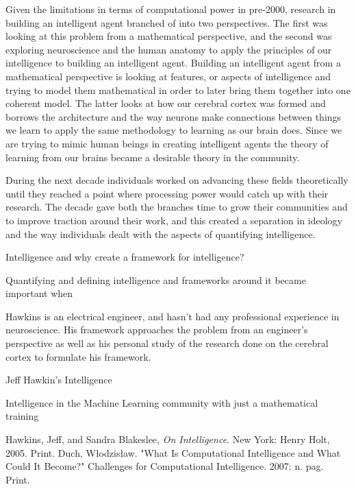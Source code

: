 \documentclass[11pt, oneside]{article}
\begin{document}
\par Given the limitations in terms of computational power in pre-2000, research in building an intelligent agent branched of into two perspectives. The first was looking at this problem from a mathematical perspective, and the second was exploring neuroscience and the human anatomy to apply the principles of our intelligence to building an intelligent agent. Building an intelligent agent from a mathematical perspective is looking at features, or aspects of intelligence and trying to model them mathematical in order to later bring them together into one coherent model. The latter looks at how our cerebral cortex was formed and borrows the architecture and the way neurons make connections between things we learn to apply the same methodology to learning as our brain does. Since we are trying to mimic human beings in creating intelligent agents the theory of learning from our brains became a desirable theory in the community. 

\par During the next decade individuals worked on advancing these fields theoretically until they reached a point where processing power would catch up with their research. The decade gave both the branches time to grow their communities and to improve traction around their work, and this created a separation in ideology and the way individuals dealt with the aspects of quantifying intelligence. 

\par Intelligence and why create a framework for intelligence?
\par Quantifying and defining intelligence and frameworks around it became important when



\par Hawkins is an electrical engineer, and hasn't had any professional experience in neuroscience. His framework approaches the problem from an engineer's perspective as well as his personal study of the research done on the cerebral cortex to formulate his framework.
\par Jeff Hawkin's Intelligence

\par Intelligence in the Machine Learning community with just a mathematical training

\begin{thebibliography}{9}
	Hawkins, Jeff, and Sandra Blakeslee,
	\emph{On Intelligence}.
	New York: Henry Holt, 2005.
	Print.
	Duch, W\l{}odzis\l{}aw.
	"What Is Computational Intelligence and What Could It Become?" Challenges for Computational Intelligence.
	2007: n. pag. Print.
\end{thebibliography}
\end{document}
